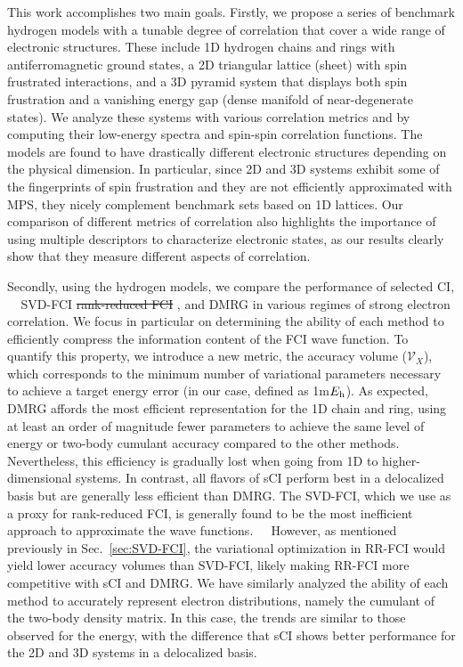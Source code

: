 \documentclass[aip,jcp,amsmath,amssymb, preprint]{revtex4-1}
\newcommand*{\Eh}{$E_{\rm h}$\xspace}
\newcommand*{\ncomp}{\mathcal{V}_X}
\newcommand{\add}[1]{\colorbox{goodgreen}{\textcolor{white}{\footnotesize  \fontfamily{phv}\selectfont +}}
    \textcolor{goodgreen}{{#1}}\xspace}
\newcommand{\remove}[1]{
\colorbox{goodred}{\textcolor{white}{\footnotesize  \fontfamily{phv}\selectfont \textminus\vphantom{c}}}
\textcolor{goodred}{\sout{#1}}\xspace
}
\begin{document}
This work accomplishes two main goals.
Firstly, we propose a series of benchmark hydrogen models with a tunable degree of correlation that cover a wide range of electronic structures.
These include 1D hydrogen chains and rings with antiferromagnetic ground states, a 2D triangular lattice (sheet)  with spin frustrated interactions, and a 3D pyramid system that displays both spin frustration and a vanishing energy gap (dense manifold of near-degenerate states).
We analyze these systems with various correlation metrics and by computing their low-energy spectra and spin-spin correlation functions.
The models are found to have drastically different electronic structures depending on the physical dimension. 
In particular, since 2D and 3D systems exhibit some of the fingerprints of spin frustration and they are not efficiently approximated with MPS, they nicely complement benchmark sets based on 1D lattices.
Our comparison of different metrics of correlation also highlights the importance of using multiple descriptors to characterize electronic states, as our results clearly show that they measure different aspects of correlation.

Secondly, using the hydrogen models, we compare the performance of selected CI, \add{SVD-FCI} \remove{rank-reduced FCI}, and DMRG in various regimes of strong electron correlation.
We focus in particular on determining the ability of each method to efficiently compress the information content of the FCI wave function.
To quantify this property, we introduce a new metric, the accuracy volume ($\ncomp$), which corresponds to the minimum number of variational parameters necessary to achieve a target energy error (in our case, defined as 1m\Eh).
As expected, DMRG affords the most efficient representation for the 1D  chain and ring, using at least an order of magnitude fewer parameters to achieve the same level of energy or two-body cumulant accuracy compared to the other methods.
Nevertheless, this efficiency is gradually lost when going from 1D to higher-dimensional systems.
In contrast, all flavors of sCI perform best in a delocalized basis but are generally less efficient than DMRG.
The SVD-FCI, which we use as a proxy for rank-reduced FCI, is generally found to be the most inefficient approach to approximate the  wave functions.
\add{However, as mentioned previously in Sec.~\ref{sec:SVD-FCI}, the variational optimization in RR-FCI would yield lower accuracy volumes than SVD-FCI, likely making RR-FCI more competitive with sCI and DMRG.}
We have similarly analyzed the ability of each method to accurately represent electron distributions, namely the cumulant of the two-body density matrix.
In this case, the trends are similar to those observed for the energy, with the difference that sCI shows better performance for the 2D and 3D systems in a delocalized basis.
\end{document}
